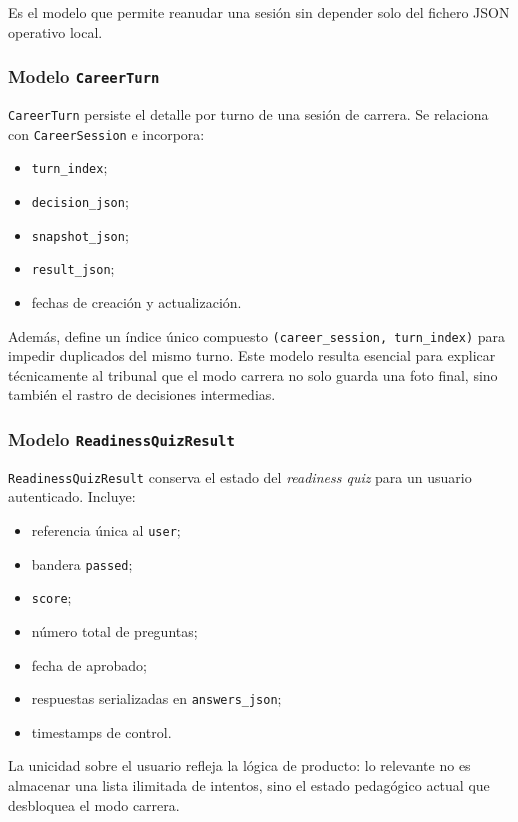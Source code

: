 Es el modelo que permite reanudar una sesión sin depender solo del fichero JSON operativo local.

\subsubsection{Modelo \texttt{CareerTurn}}

\texttt{CareerTurn} persiste el detalle por turno de una sesión de carrera. Se relaciona con \texttt{CareerSession} e incorpora:

\begin{itemize}
    \item \texttt{turn\_index};
    \item \texttt{decision\_json};
    \item \texttt{snapshot\_json};
    \item \texttt{result\_json};
    \item fechas de creación y actualización.
\end{itemize}

Además, define un índice único compuesto \texttt{(career\_session, turn\_index)} para impedir duplicados del mismo turno. Este modelo resulta esencial para explicar técnicamente al tribunal que el modo carrera no solo guarda una foto final, sino también el rastro de decisiones intermedias.

\subsubsection{Modelo \texttt{ReadinessQuizResult}}

\texttt{ReadinessQuizResult} conserva el estado del \textit{readiness quiz} para un usuario autenticado. Incluye:

\begin{itemize}
    \item referencia única al \texttt{user};
    \item bandera \texttt{passed};
    \item \texttt{score};
    \item número total de preguntas;
    \item fecha de aprobado;
    \item respuestas serializadas en \texttt{answers\_json};
    \item timestamps de control.
\end{itemize}

La unicidad sobre el usuario refleja la lógica de producto: lo relevante no es almacenar una lista ilimitada de intentos, sino el estado pedagógico actual que desbloquea el modo carrera.

